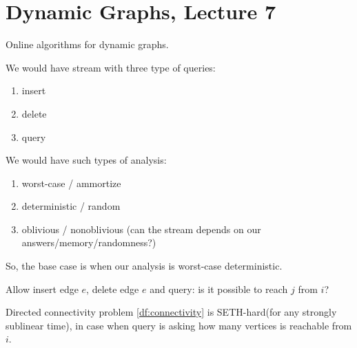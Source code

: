 \section{Dynamic Graphs, Lecture 7}

Online algorithms for dynamic graphs.

\begin{df}
  We would have stream with three type of queries:
  \begin{enumerate}
	  \item insert
	\item delete
	\item query
  \end{enumerate}

  We would have such types of analysis:

  \begin{enumerate}
	  \item worst-case / ammortize
	\item  deterministic / random
	\item oblivious / nonoblivious (can the stream depends on our answers/memory/randomness?)
  \end{enumerate}

  So, the base case is when our analysis is worst-case deterministic.
\end{df}

\begin{df} \label{df:connectivity}
	Allow insert edge $e$, delete edge $e$ and query: is it possible to reach $j$ from $i$? 
\end{df}

\begin{thm}
	Directed connectivity problem \ref{df:connectivity} is SETH-hard(for any strongly sublinear time), in case when query is asking how many vertices is reachable from $i$.
\end{thm}

